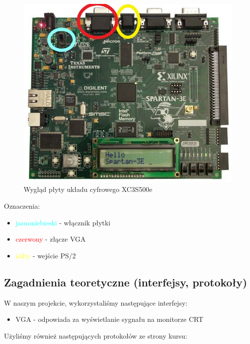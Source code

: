 \documentclass[a4paper]{article}
\begin{document}
\begin{figure}[h]
  \caption{Wygląd płyty układu cyfrowego XC3S500e}
  \includegraphics[scale=0.35]{plyta}
  \centering
\end{figure}

Oznaczenia:
\begin{itemize}
\item \textcolor{cyan}{jasnoniebieski} - włącznik płytki
\item \textcolor{red}{czerwony} - złącze VGA
\item \textcolor{yellow}{żółty} - wejście PS/2
\end{itemize}


\newpage

\subsection{Zagadnienia teoretyczne (interfejsy, protokoły)}

W naszym projekcie, wykorzystaliśmy następujące interfejsy:
\begin{itemize}

  \item VGA - odpowiada za wyświetlanie sygnału na monitorze CRT

\end{itemize}

Użyliśmy również następujących protokołów ze strony kursu:
\end{document}
